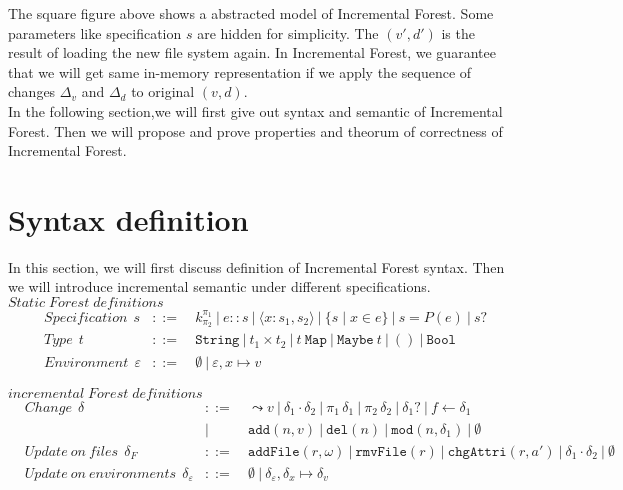\documentclass[10pt,twoside,a4paper]{article}
\theoremstyle{theorem}
\theoremstyle{lemma}
\theoremstyle{property}
\theoremstyle{definition}
\theoremstyle{assumption}
\def\fst{\pi_1}
\def\snd{\pi_2}
\begin{document}
The square figure above shows a abstracted model of Incremental Forest. Some parameters like specification $s$ are hidden for simplicity. The $(v',d')$ is the result of loading the new file system again. In Incremental Forest, we guarantee that we will get same in-memory representation if we apply the sequence of changes $\Delta_v$ and $\Delta_d$ to original $(v,d)$.\\

In the following section,we will first give out syntax and semantic of Incremental Forest. Then we will propose and prove properties and theorum of correctness of Incremental Forest.

\newpage

\section{Syntax definition}

In this section, we will first discuss definition of Incremental Forest syntax. Then we will introduce incremental semantic under different specifications.\\

$\boxed{Static\; Forest\; definitions}$
\begin{align*}
	& Specification ~~s	& ::= 	& ~k^{\pi_1}_{\pi_2} ~|~ e::s ~|~ \langle x : s_1, s_2 \rangle ~|~ \{s\mid x\in e\} ~|~ s = P(e) ~|~ s? \\
	& Type ~~t & ::= 	& ~\mathtt{String} ~|~ t_1 \times t_2 ~|~ t~\mathtt{Map} ~|~ \mathtt{Maybe}~t ~|~ \mathtt{()} ~|~ \mathtt{Bool}\\
	& Environment ~~\varepsilon & ::= & ~\emptyset ~|~ \varepsilon, x\mapsto v
\end{align*}

$\boxed{incremental\;Forest\;definitions}$
\begin{align*}
	& Change ~~\delta & ::= 	& ~\leadsto v ~|~ \delta_1 \cdot \delta_2 ~|~ \fst\,\delta_1 ~|~ \snd\,\delta_2 ~|~ \delta_1? ~|~ f \leftarrow \delta_1\\
	& 		& |		&~ \mathtt{add}(n, v) ~|~ \mathtt{del}(n) ~|~ \mathtt{mod}(n, \delta_1) ~|~ \emptyset\\
	& Update~on~files ~~\delta_F 	& ::= 	& ~\mathtt{addFile}(r,\omega) ~|~ \mathtt{rmvFile}(r) ~|~ \mathtt{chgAttri}(r,a') ~|~ \delta_1 \cdot \delta_2 ~|~ \emptyset\\
	& Update~on~environments ~~\delta_\varepsilon & ::= & ~\emptyset ~|~ \delta_\varepsilon, \delta_x \mapsto \delta_v \\
\end{align*}
\end{document}

